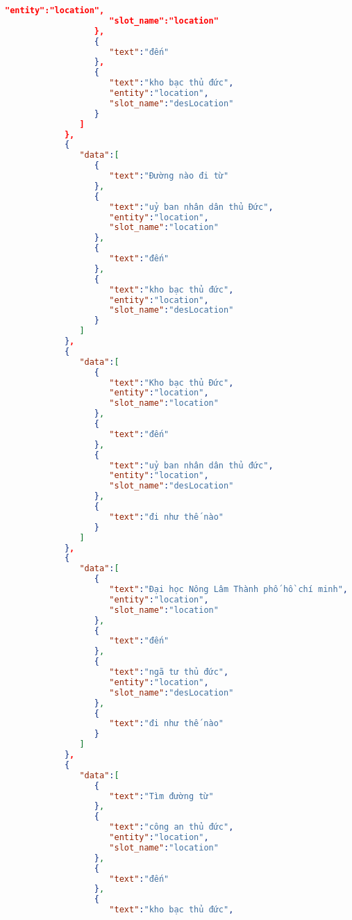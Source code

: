 \begin{lstlisting}[language=json,firstnumber=1]
                     "entity":"location",
                     "slot_name":"location"
                  },
                  {
                     "text":"đến"
                  },
                  {
                     "text":"kho bạc thủ đức",
                     "entity":"location",
                     "slot_name":"desLocation"
                  }
               ]
            },
            {
               "data":[
                  {
                     "text":"Đường nào đi từ"
                  },
                  {
                     "text":"uỷ ban nhân dân thủ Đức",
                     "entity":"location",
                     "slot_name":"location"
                  },
                  {
                     "text":"đến"
                  },
                  {
                     "text":"kho bạc thủ đức",
                     "entity":"location",
                     "slot_name":"desLocation"
                  }
               ]
            },
            {
               "data":[
                  {
                     "text":"Kho bạc thủ Đức",
                     "entity":"location",
                     "slot_name":"location"
                  },
                  {
                     "text":"đến"
                  },
                  {
                     "text":"uỷ ban nhân dân thủ đức",
                     "entity":"location",
                     "slot_name":"desLocation"
                  },
                  {
                     "text":"đi như thế nào"
                  }
               ]
            },
            {
               "data":[
                  {
                     "text":"Đại học Nông Lâm Thành phố hồ chí minh",
                     "entity":"location",
                     "slot_name":"location"
                  },
                  {
                     "text":"đến"
                  },
                  {
                     "text":"ngã tư thủ đức",
                     "entity":"location",
                     "slot_name":"desLocation"
                  },
                  {
                     "text":"đi như thế nào"
                  }
               ]
            },
            {
               "data":[
                  {
                     "text":"Tìm đường từ"
                  },
                  {
                     "text":"công an thủ đức",
                     "entity":"location",
                     "slot_name":"location"
                  },
                  {
                     "text":"đến"
                  },
                  {
                     "text":"kho bạc thủ đức",

\end{lstlisting}
